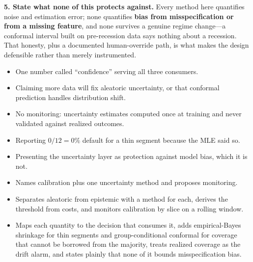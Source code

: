 \begin{interviewq}
\textbf{5. State what none of this protects against.} Every method here quantifies noise and estimation error; none quantifies \textbf{bias from misspecification or from a missing feature}, and none survives a genuine regime change---a conformal interval built on pre-recession data says nothing about a recession. That honesty, plus a documented human-override path, is what makes the design defensible rather than merely instrumented.

\redflags
\begin{itemize}
    \item One number called ``confidence'' serving all three consumers.
    \item Claiming more data will fix aleatoric uncertainty, or that conformal prediction handles distribution shift.
    \item No monitoring: uncertainty estimates computed once at training and never validated against realized outcomes.
    \item Reporting $0/12 = 0\%$ default for a thin segment because the MLE said so.
    \item Presenting the uncertainty layer as protection against model bias, which it is not.
\end{itemize}


\goodgreat
\begin{itemize}
    \item {} Names calibration plus one uncertainty method and proposes monitoring.
    \item {} Separates aleatoric from epistemic with a method for each, derives the threshold from costs, and monitors calibration by slice on a rolling window.
    \item {} Maps each quantity to the decision that consumes it, adds empirical-Bayes shrinkage for thin segments and group-conditional conformal for coverage that cannot be borrowed from the majority, treats realized coverage as the drift alarm, and states plainly that none of it bounds misspecification bias.
\end{itemize}

\end{interviewq}
